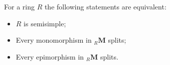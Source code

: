 For a ring $R$ the following statements are equivalent:
\begin{itemize}
\item[(a)] $R$ is semisimple;
\item[(b)] Every monomorphism in ${}_R\mathbf{M}$ splits;
\item[(c)] Every epimorphism in ${}_R\mathbf{M}$ splits.
\end{itemize}
